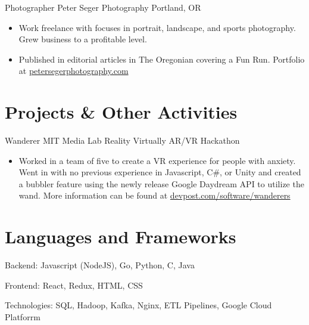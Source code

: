 \documentclass[11 pt]{moderncv}
\begin{document}
{Photographer}
{Peter Seger Photography}
{Portland, OR}
{}
{
\begin{itemize}
	\item Work freelance with focuses in portrait, landscape, and sports photography. Grew business to a profitable level.
	\item Published in editorial articles in The Oregonian covering a Fun Run. Portfolio at \href{www.petersegerphotography.com}{petersegerphotography.com}
\end{itemize}
}



\vspace{0.08 in}
\section{Projects \& Other Activities}
\vspace{0.1 in}


{Wanderer}
{MIT Media Lab Reality Virtually AR/VR Hackathon}
{}
{}
{
\begin{itemize}
	\item Worked in a team of five to create a VR experience for people with anxiety. Went in with no previous experience in Javascript, C\#, or Unity and created a bubbler feature using the newly release Google Daydream API to utilize the wand. More information can be found at \href{https://devpost.com/software/wanderers}{devpost.com/software/wanderers}
\end{itemize}
}

\section{Languages and Frameworks}

\cvline{}
{
	Backend: 
	Javascript (NodeJS),
	Go,
	Python,
	C,
	Java
}

\cvline{}
{
	Frontend:
	React,
	Redux,
	HTML,
	CSS
}

\cvline{}
{
	Technologies: 
	SQL,
	Hadoop,
	Kafka,
	Nginx,
	ETL Pipelines,
	Google Cloud Platforrm
}
\end{document}
